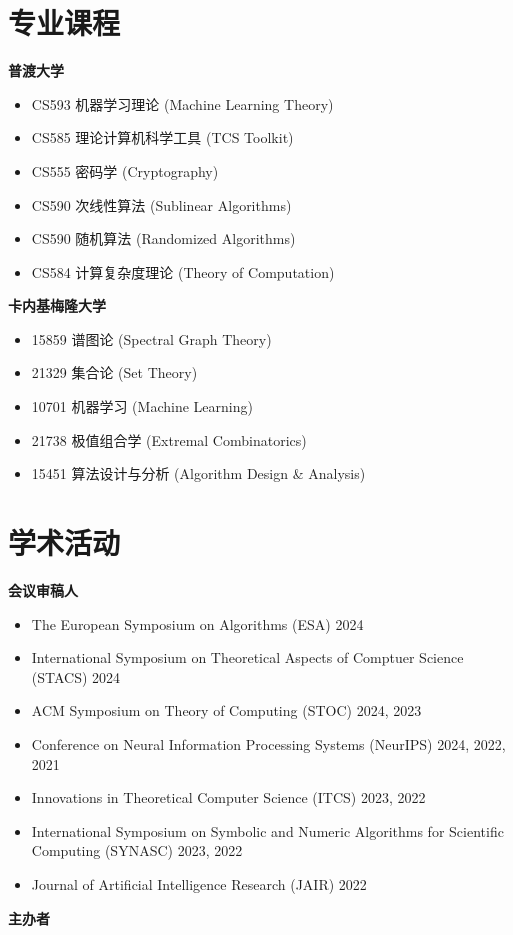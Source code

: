 \documentclass[margin, 10pt]{res} %
\begin{document}
\begin{resume}
\section{专业课程}
{\bf 普渡大学}
\begin{itemize}
    \item CS593 机器学习理论 (Machine Learning Theory)
    \item CS585 理论计算机科学工具 (TCS Toolkit)
    \item CS555 密码学 (Cryptography)
    \item CS590 次线性算法 (Sublinear Algorithms)
    \item CS590 随机算法 (Randomized Algorithms)
    \item CS584 计算复杂度理论 (Theory of Computation)
\end{itemize}

{\bf 卡内基梅隆大学}
\begin{itemize}
    \item 15859 谱图论 (Spectral Graph Theory)
    \item 21329 集合论 (Set Theory)
    \item 10701 机器学习 (Machine Learning)
    \item 21738 极值组合学 (Extremal Combinatorics)
    \item 15451 算法设计与分析 (Algorithm Design \& Analysis)
\end{itemize}

\section{学术活动}

{\bf 会议审稿人}

\begin{itemize}
\item The European Symposium on Algorithms (ESA) 2024
\item International Symposium on Theoretical Aspects of Comptuer Science (STACS) 2024
\item ACM Symposium on Theory of Computing (STOC) 2024, 2023
\item Conference on Neural Information Processing Systems (NeurIPS) 2024, 2022, 2021
\item Innovations in Theoretical Computer Science (ITCS) 2023, 2022
\item International Symposium on Symbolic and Numeric Algorithms for Scientific Computing (SYNASC) 2023, 2022
\item Journal of Artificial Intelligence Research (JAIR) 2022
\end{itemize}
{\bf 主办者}


\end{resume}
\end{document}

